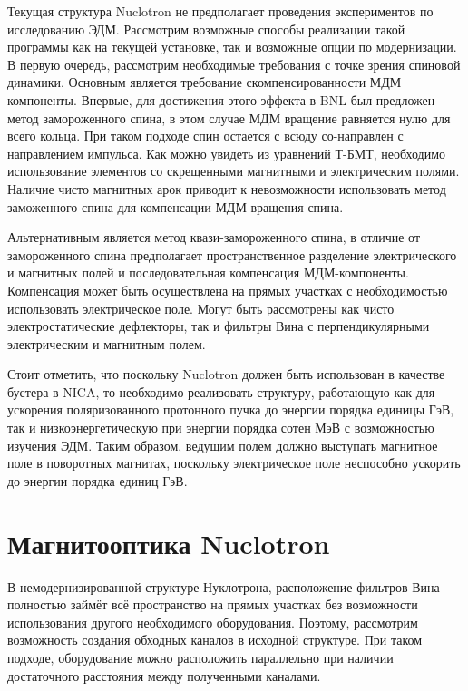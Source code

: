 \noindent Текущая структура Nuclotron не предполагает проведения экспериментов по исследованию ЭДМ. Рассмотрим возможные способы реализации такой программы как на текущей установке, так и возможные опции по модернизации. В первую очередь, рассмотрим необходимые требования с точке зрения спиновой динамики. Основным является требование скомпенсированности МДМ компоненты. Впервые, для достижения этого эффекта в BNL был предложен метод замороженного спина, в этом случае МДМ вращение равняется нулю для всего кольца. При таком подходе спин остается с всюду со-направлен с направлением импульса. Как можно увидеть из уравнений Т-БМТ, необходимо использование элементов со скрещенными магнитными и электрическим полями. 
Наличие чисто магнитных арок приводит к невозможности использовать метод заможенного спина для компенсации МДМ вращения спина. 
\par Альтернативным является метод квази-замороженного спина, в отличие от замороженного спина предполагает пространственное разделение электрического и магнитных полей и последовательная компенсация МДМ-компоненты. Компенсация может быть осуществлена на прямых участках с необходимостью использовать электрическое поле. Могут быть рассмотрены как чисто электростатические дефлекторы, так и фильтры Вина с перпендикулярными электрическим и магнитным полем.

\noindent Стоит отметить, что поскольку Nuclotron должен быть использован в качестве бустера в NICA, то необходимо реализовать структуру, работающую как для ускорения поляризованного протонного пучка до энергии порядка единицы ГэВ, так и низкоэнергетическую при энергии порядка сотен МэВ с возможностью изучения ЭДМ. Таким образом, ведущим полем должно выступать магнитное поле в поворотных магнитах, поскольку электрическое поле неспособно ускорить до энергии порядка единиц ГэВ. 	
	
	
	\section{Магнитооптика Nuclotron}\label{sec:EDM/optics}
	
\par В немодернизированной структуре Нуклотрона, расположение фильтров Вина полностью займёт всё пространство на прямых участках без возможности использования другого необходимого оборудования. Поэтому, рассмотрим возможность создания обходных каналов в исходной структуре. При таком подходе, оборудование можно расположить параллельно при наличии достаточного расстояния между полученными каналами.

